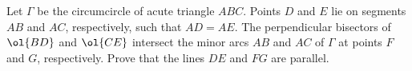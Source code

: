 Let $\Gamma$ be the circumcircle of acute triangle $ABC$.
Points $D$ and $E$ lie on segments $AB$ and $AC$,
respectively, such that $AD = AE$.
The perpendicular bisectors of $\ol{BD}$ and $\ol{CE}$
intersect the minor arcs $AB$ and $AC$ of $\Gamma$
at points $F$ and $G$, respectively.
Prove that the lines $DE$ and $FG$ are parallel.